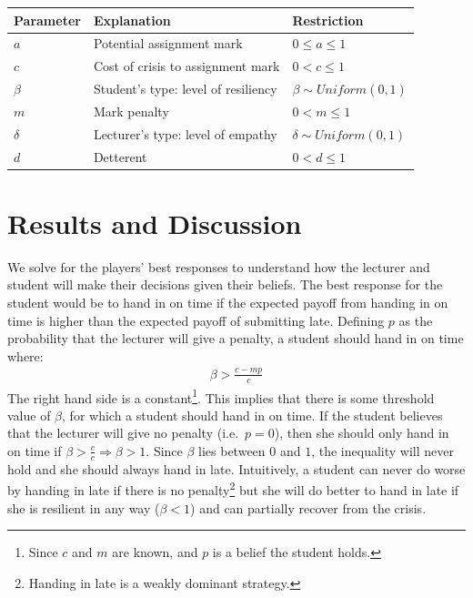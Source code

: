 \documentclass[11pt,preprint, authoryear]{elsarticle}
\let\origtable\table
\let\endorigtable\endtable
\renewenvironment{table}[1][2] {
    \expandafter\origtable\expandafter[H]
} {
    \endorigtable
}
\numberwithin{equation}{section}
\numberwithin{figure}{section}
\numberwithin{table}{section}
\let\rmarkdownfootnote\footnote%
\def\footnote{\protect\rmarkdownfootnote}
\begin{document}
\begin{table}[H]
\centering
\begin{tabular}{lll}
  \toprule
Parameter & Explanation & Restriction \\ 
  \midrule
$a$ & Potential assignment mark & $0\leq a \leq 1$ \\ 
  $c$ & Cost of crisis to assignment mark & $0 < c \leq 1$ \\ 
  $\beta$ & Student's type: level of resiliency & $\beta \sim Uniform(0,1)$  \\ 
  $m$ & Mark penalty & $0 < m \leq 1$ \\ 
  $\delta$ & Lecturer's type: level of empathy & $\delta \sim Uniform(0,1)$ \\ 
  $d$ & Detterent & $0<d \leq 1$ \\ 
   \bottomrule
\end{tabular}
\caption{Game Parameters \label{sum}} 
\end{table}

\hypertarget{results-and-discussion}{%
\section{\texorpdfstring{Results and Discussion
\label{result}}{Results and Discussion }}\label{results-and-discussion}}

We solve for the players' best responses to understand how the lecturer
and student will make their decisions given their beliefs. The best
response for the student would be to hand in on time if the expected
payoff from handing in on time is higher than the expected payoff of
submitting late. Defining \(p\) as the probability that the lecturer
will give a penalty, a student should hand in on time where:\\
\begin{align*}
\beta>\frac{c-m p}{c}
\end{align*} The right hand side is a constant\footnote{Since \(c\) and
  \(m\) are known, and \(p\) is a belief the student holds.}. This
implies that there is some threshold value of \(\beta\), for which a
student should hand in on time. If the student believes that the
lecturer will give no penalty (i.e.~\(p=0\)), then she should only hand
in on time if \(\beta > \frac{c}{c} \Rightarrow \beta > 1\). Since
\(\beta\) lies between \(0\) and \(1\), the inequality will never hold
and she should always hand in late. Intuitively, a student can never do
worse by handing in late if there is no penalty\footnote{Handing in late
  is a weakly dominant strategy.} but she will do better to hand in late
if she is resilient in any way (\(\beta < 1\)) and can partially recover
from the crisis.
\end{document}

